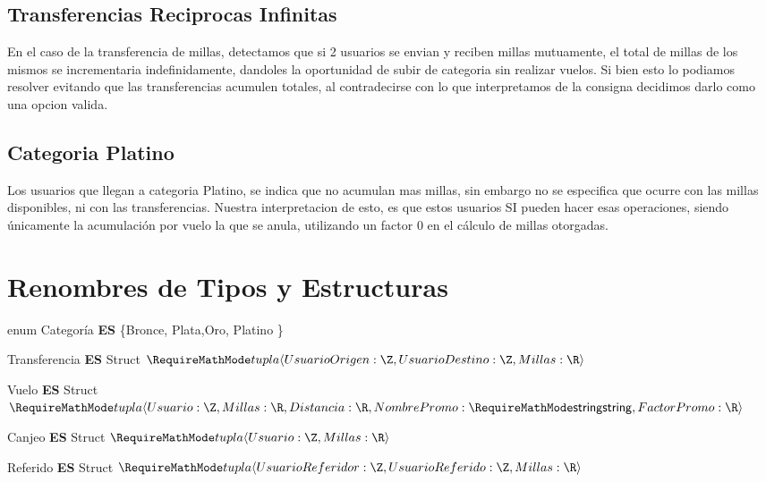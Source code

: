 \documentclass[11pt,a4paper]{article}
\newcommand{\Tipo}[1]{\mathsf{#1}}
\begin{document}
\subsection{Transferencias Reciprocas Infinitas}
En el caso de la transferencia de millas, detectamos que si 2 usuarios se envian y reciben millas mutuamente, el total de millas de los mismos se incrementaria indefinidamente, dandoles la oportunidad de subir de categoria sin realizar vuelos. Si bien esto lo podiamos resolver evitando que las transferencias acumulen totales, al contradecirse con lo que interpretamos de la consigna decidimos darlo como una opcion valida.

\subsection{Categoria Platino}
Los usuarios que llegan a categoria Platino, se indica que no acumulan mas millas, sin embargo no se especifica que ocurre con las millas disponibles, ni con las transferencias. Nuestra interpretacion de esto, es que estos usuarios SI pueden hacer esas operaciones, siendo únicamente la acumulación por vuelo la que se anula, utilizando un factor 0 en el cálculo de millas otorgadas.


\section{Renombres de Tipos y Estructuras}

\noindent enum Categoría \textbf{ES} \{Bronce, Plata,Oro, Platino  \}

\noindent Transferencia \textbf{ES} Struct $\tupla{
		UsuarioOrigen: \Tipo{\Z},
		UsuarioDestino: \Tipo{\Z},
		Millas: \Tipo{\R}
	}$

\noindent Vuelo \textbf{ES} Struct $\tupla{
		Usuario: \Tipo{\Z},
		Millas: \Tipo{\R},
		Distancia: \Tipo{\R},
		NombrePromo: \Tipo{\str}, \\
		FactorPromo: \Tipo{\R}
	}$

\noindent Canjeo  \textbf{ES} Struct $\tupla{
		Usuario: \Tipo{\Z},
		Millas: \Tipo{\R}
	}$

\noindent Referido  \textbf{ES} Struct $\tupla{
		UsuarioReferidor: \Tipo{\Z},
		UsuarioReferido: \Tipo{\Z},
		Millas: \Tipo{\R}
	}$

\vspace{2em}
\end{document}
